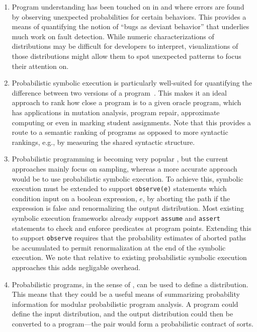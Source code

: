 \begin{enumerate}

\item Program understanding has been touched on in \cite{Geldenhuys2012} and \cite{Filieri2015} where errors are found by observing unexpected probabilities for certain behaviors.  This provides a means of quantifying the notion of ``bugs as deviant behavior'' that underlies much work on fault detection.   While numeric characterizations of distributions may be difficult for developers to interpret, visualizations of those distributions might allow them to spot unexpected patterns to focus their attention on.

\item Probabilistic symbolic execution is particularly well-suited for quantifying the difference between two versions of a program~\cite{Filieri2015b}. This makes it an ideal approach to rank how close a program is to a given oracle program, which has applications in mutation analysis, program repair, approximate computing or even in marking student assignments.  Note that this provides a route to a semantic ranking of programs as opposed to more syntactic rankings, e.g., by measuring the shared syntactic structure. 

\item Probabilistic programming is becoming very popular \cite{Gordon2014}, but the current approaches mainly focus on sampling, whereas a more accurate approach would be to use probabilistic symbolic execution.  
To achieve this, symbolic execution must be extended to support
\texttt{observe(e)} statements which condition input on a boolean expression,
$e$, by aborting the path if the expression is false and renormalizing the
output distribution.
Most existing symbolic execution frameworks already support \texttt{assume} and \texttt{assert} statements to check and enforce predicates at program points.
Extending this to support \texttt{observe} requires that the probability
estimates of aborted paths be accumulated to permit renormalization at the
end of the symbolic execution.  We note that relative to existing probabilistic
symbolic execution approaches this adds negligable overhead.

\item Probabilistic programs, in the sense of \cite{Gordon2014}, can be used
to define a distribution.  This means that they could be a useful means of
summarizing probability information for modular probabilistic program analysis.
A program could define the input distribution, and the output distribution
could then be converted to a program---the pair would form a probabilistic
contract of sorts.


\end{enumerate}
